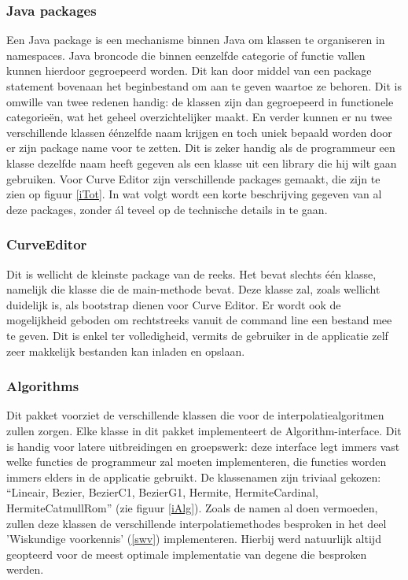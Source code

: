 \documentclass[a4paper,11pt,oneside, titlepage]{article}
\begin{document}
\subsubsection{Java packages}
Een Java package is een mechanisme binnen Java om klassen te organiseren in namespaces. 
Java broncode die binnen eenzelfde categorie of functie vallen kunnen hierdoor gegroepeerd 
worden. Dit kan door middel van een package statement bovenaan het beginbestand om aan te 
geven waartoe ze behoren. Dit is omwille van twee redenen handig: de klassen zijn dan gegroepeerd
in functionele categorie\"en, wat het geheel overzichtelijker maakt. En verder kunnen er nu twee 
verschillende klassen \'e\'enzelfde naam krijgen en toch uniek bepaald worden door er zijn
package name voor te zetten. Dit is zeker handig als de programmeur een klasse dezelfde naam
heeft gegeven als een klasse uit een library die hij wilt gaan gebruiken.\newline \newline
Voor Curve Editor zijn verschillende packages gemaakt, die zijn te zien op figuur \ref{iTot}.
In wat volgt wordt een korte beschrijving gegeven van al deze packages, zonder \'al teveel op de technische details in
te gaan.
\subsubsection{CurveEditor}
Dit is wellicht de kleinste package van de reeks. Het bevat slechts \'e\'en klasse, 
namelijk die klasse die de main-methode bevat. Deze klasse zal, zoals wellicht duidelijk is, als bootstrap dienen voor Curve Editor. 
Er wordt ook de mogelijkheid geboden om rechtstreeks vanuit
de command line een bestand mee te geven. Dit is enkel ter volledigheid, vermits de gebruiker in de applicatie zelf zeer makkelijk bestanden kan inladen en opslaan.
\subsubsection{Algorithms}
Dit pakket voorziet de verschillende klassen die voor de interpolatiealgoritmen zullen zorgen.
Elke klasse in dit pakket implementeert de Algorithm-interface. Dit is handig voor latere uitbreidingen en groepswerk: deze interface 
legt immers vast welke functies de programmeur zal moeten implementeren, die functies worden immers elders in de applicatie gebruikt. \newline
De klassenamen zijn triviaal gekozen: ``Lineair, Bezier, BezierC1, BezierG1, Hermite, 
HermiteCardinal, HermiteCatmullRom'' (zie figuur \ref{iAlg}).
Zoals de namen al doen vermoeden, zullen deze klassen de verschillende
interpolatiemethodes besproken in het deel 'Wiskundige voorkennis' (\ref{swv}) implementeren.
Hierbij werd natuurlijk altijd geopteerd voor de meest optimale implementatie van degene die 
besproken werden.
\end{document}
